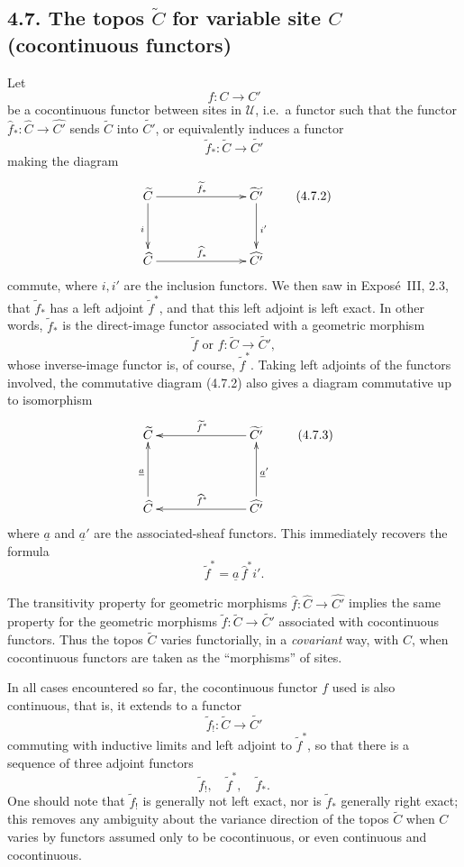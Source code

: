\documentclass[11pt]{article}
\newcommand{\U}{\mathcal{U}}
\newcommand{\ie}{i.e.}
\begin{document}
\subsection*{4.7. The topos \(\widetilde C\) for variable site \(C\) (cocontinuous functors)}
Let
\[
f:C\longrightarrow C'
\]
be a cocontinuous functor between sites in \(\U\), \ie\ a functor such that the functor \(\widehat f_\ast:\widehat C\to\widehat{C'}\) sends \(\widetilde C\) into \(\widetilde{C'}\), or equivalently induces a functor
\[
\widetilde f_\ast:\widetilde C\longrightarrow\widetilde{C'}\tag{4.7.1}
\]
making the diagram
\[
\xymatrix@C=2.5cm@R=1.25cm{
\widetilde C \ar[r]^{\widetilde f_\ast} \ar[d]_{i}&
\widetilde{C'} \ar[d]^{i'}\\
\widehat C \ar[r]^{\widehat f_\ast}&\widehat{C'}
}\tag{4.7.2}
\]
commute, where \(i,i'\) are the inclusion functors. We then saw in Expos\'e~III, 2.3, that \(\widetilde f_\ast\) has a left adjoint \(\widetilde f^\ast\), and that this left adjoint is left exact. In other words, \(\widetilde f_\ast\) is the direct-image functor associated with a geometric morphism
\[
\widetilde f\text{ or }f:\widetilde C\longrightarrow\widetilde{C'},
\]
whose inverse-image functor is, of course, \(\widetilde f^\ast\). Taking left adjoints of the functors involved, the commutative diagram (4.7.2) also gives a diagram commutative up to isomorphism
\[
\xymatrix@C=2.5cm@R=1.5cm{
\widetilde C & \widetilde{C'} \ar[l]_{\widetilde f^\ast}\\
\widehat C \ar[u]^{\underline a} & \widehat{C'} \ar[l]_{\widehat f^\ast}\ar[u]_{\underline a'}
}\tag{4.7.3}
\]
where \(\underline a\) and \(\underline a'\) are the associated-sheaf functors. This immediately recovers the formula
\[
\widetilde f^\ast=\underline a\,\widehat f^\ast i'.
\]

The transitivity property for geometric morphisms \(\widehat f:\widehat C\to\widehat{C'}\) implies the same property for the geometric morphisms \(\widetilde f:\widetilde C\to\widetilde{C'}\) associated with cocontinuous functors. Thus the topos \(\widetilde C\) varies functorially, in a \emph{covariant} way, with \(C\), when cocontinuous functors are taken as the ``morphisms'' of sites.

In all cases encountered so far, the cocontinuous functor \(f\) used is also continuous, that is, it extends to a functor
\[
\widetilde f_!:\widetilde C\longrightarrow\widetilde{C'}
\]
commuting with inductive limits and left adjoint to \(\widetilde f^\ast\), so that there is a sequence of three adjoint functors
\[
\widetilde f_!,\quad \widetilde f^\ast,\quad \widetilde f_\ast.
\]
One should note that \(\widetilde f_!\) is generally not left exact, nor is \(\widetilde f_\ast\) generally right exact; this removes any ambiguity about the variance direction of the topos \(\widetilde C\) when \(C\) varies by functors assumed only to be cocontinuous, or even continuous and cocontinuous.
\end{document}
